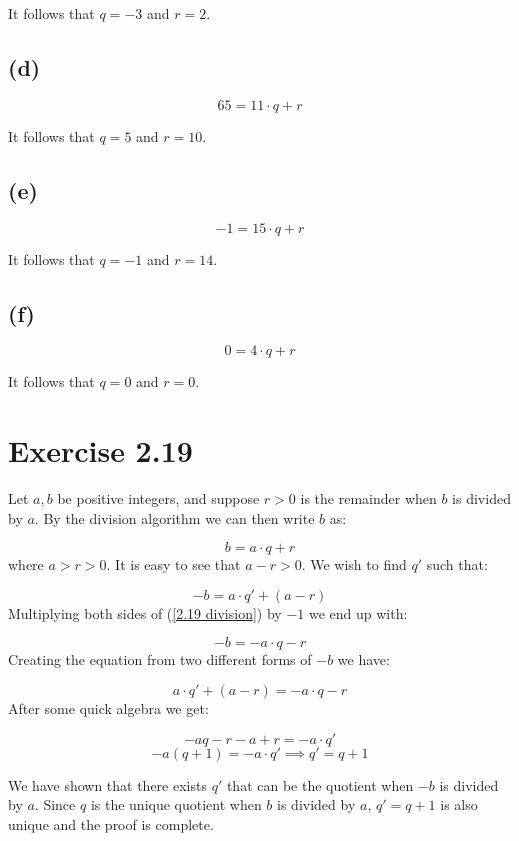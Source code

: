 \documentclass{article}
\begin{document}
It follows that $q=-3$ and $r=2$.
\subsection*{(d)}
\begin{equation*}
	65 = 11 \cdot q + r
\end{equation*}

It follows that $q=5$ and $r=10$.
\subsection*{(e)}
\begin{equation*}
	-1 = 15 \cdot q + r
\end{equation*}

It follows that $q=-1$ and $r=14$.
\subsection*{(f)}
\begin{equation*}
	0 = 4 \cdot q + r
\end{equation*}

It follows that $q=0$ and $r=0$.



\section*{Exercise 2.19}


Let $a, b$ be positive integers, and suppose $r > 0$ is the remainder when
\(b\) is divided by \(a\). By the division algorithm we can then write \(b\)
as:

\begin{equation} \label{2.19 division}
	b = a \cdot q + r
\end{equation}
where $a > r > 0$. It is easy to see that \(a - r > 0\). We wish to find \(q'\)
such that:

\begin{equation*}
	-b = a \cdot q' + (a-r)
\end{equation*}
Multiplying both sides of (\ref{2.19 division}) by \(-1\) we end up with:

\begin{equation*}
	-b = -a \cdot q - r
\end{equation*}
Creating the equation from two different forms of \(-b\) we have:

\begin{equation*}	
	a \cdot q' + (a-r) = -a \cdot q - r
\end{equation*}
After some quick algebra we get:

\begin{equation*}
	-aq - r - a + r = -a \cdot q'
\end{equation*}
\begin{equation*}
	-a(q+1) = -a \cdot q' \implies q' = q + 1
\end{equation*}

We have shown that there exists \(q'\) that can be the quotient when \(-b\) is
divided by \(a\). Since \(q\) is the unique quotient when \(b\) is divided by
\(a\), \(q' = q + 1\) is also unique and the proof is complete. 
\end{document}
